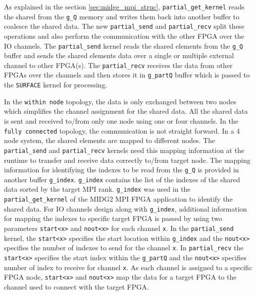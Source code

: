 As explained in the section \ref{sec:midge_mpi_struc}, \texttt{partial\_get\_kernel} reads
the shared from the \texttt{g\_Q} memory and writes them back into another buffer
to coalesce the shared data. The new \texttt{partial\_send} and \texttt{partial\_recv}
split these operations and also perform the communication with the
other FPGA over the IO channels. The \texttt{partial\_send} kernel reads the
shared elements from the \texttt{g\_Q} buffer and sends the shared elements data
over a single or multiple external channel to other FPGA(s).
The \texttt{partial\_recv} receives the data from other FPGAs over the channels and
then stores it in \texttt{g\_partQ} buffer which is passed to the \texttt{SURFACE}
kernel for processing.

In the \texttt{within node} topology, the data is only exchanged between two nodes
which simplifies the channel assignment for the shared data. All the shared data is sent and received
to/from only one node using one or four channels. In the \texttt{fully connected} topology,
the communication is not straight forward. In a 4 node system, the shared elements are mapped
to different nodes. The \texttt{partial\_send} and \texttt{partial\_recv} kernels need this mapping
information at the runtime to transfer and receive data correctly to/from target node. The mapping information
for identifying the indexes to be read from the \texttt{g\_Q} is provided in another buffer
\texttt{g\_index}. \texttt{g\_index} contains the list of the indexes of the shared data
sorted by the target \ac{MPI} rank. \texttt{g\_index} was used in the \texttt{partial\_get\_kernel}
of the MIDG2 \ac{MPI} FPGA application to identify the shared data. For IO channels design along with
\texttt{g\_index}, additional information for mapping the indexes to specific target FPGA is
passed by using two parameters \texttt{start<x>} and \texttt{nout<x>} for each channel \texttt{x}.
In the \texttt{partial\_send} kernel, the \texttt{start<x>} specifies the start location within \texttt{g\_index}
and the \texttt{nout<x>} specifies the number of indexes to send for the channel \texttt{x}. In
\texttt{partial\_recv} the \texttt{start<x>} specifies the start index within the \texttt{g\_partQ}
and the \texttt{nout<x>} specifies number of index to receive for channel \texttt{x}. As each
channel is assigned to a specific FPGA node, \texttt{start<x>} and \texttt{nout<x>} map
the data for a target FPGA to the channel used to connect with the target FPGA.

